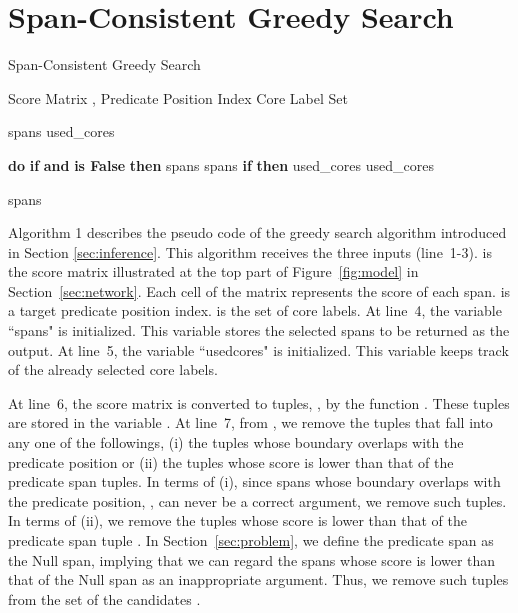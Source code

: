 \documentclass[11pt,a4paper]{article}
\begin{document}



\newpage
\appendix

\section{Span-Consistent Greedy Search}
\label{sec:decode}
\begin{algorithm}[H]
\caption{Span-Consistent Greedy Search}
\begin{algorithmic}[1]
 Score Matrix , 
\STATE \hspace{1.1cm} Predicate Position Index 
\STATE \hspace{1.1cm} Core Label Set 

\STATE spans 
\STATE used\_cores 

\STATE 
\STATE 
{}  {\bf do}
\STATE \hspace{0.25cm} {\bf if}  {\bf and}
\STATE \hspace{0.6cm}  {\bf is False} {\bf then}
\STATE \hspace{1cm} spans  spans 
\STATE \hspace{1cm} {\bf if}  {\bf then}
\STATE \hspace{1.3cm} used\_cores  used\_cores 

 spans
\end{algorithmic}
\end{algorithm}

\noindent
Algorithm 1 describes the pseudo code of the greedy search algorithm introduced in Section \ref{sec:inference}.
This algorithm receives the three inputs (line~1-3).
 is the score matrix illustrated at the top part of Figure\ \ref{fig:model} in Section\ \ref{sec:network}.
Each cell of the matrix represents the score of each span.
 is a target predicate position index.
 is the set of core labels.
At line~4, the variable ``spans" is initialized.
This variable stores the selected spans to be returned as the output.
At line~5, the variable ``usedcores" is initialized.
This variable keeps track of the already selected core labels.

At line~6, the score matrix  is converted to tuples, , by the function .
These tuples are stored in the variable .
At line~7, from , we remove the tuples that fall into any one of the followings, (i) the tuples whose boundary  overlaps with the predicate position  or (ii) the tuples whose score is lower than that of the predicate span tuples.
In terms of (i), since spans whose boundary  overlaps with the predicate position, , can never be a correct argument, we remove such tuples.
In terms of (ii), we remove the tuples  whose score is lower than that of the predicate span tuple .
In Section\ \ref{sec:problem}, we define the predicate span  as the {\sc Null} span, implying that we can regard the spans whose score is lower than that of the {\sc Null} span as an inappropriate argument.
Thus, we remove such tuples from the set of the candidates .
\end{document}
